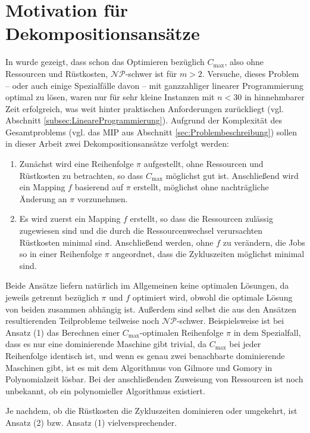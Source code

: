 \documentclass{scrreprt}
\begin{document}
\section{Motivation für Dekompositionsansätze}
In \cite{casestudy} wurde gezeigt, dass schon das Optimieren bezüglich $C_{\max}$, also ohne Ressourcen und Rüstkosten, $\mathcal{NP}$-schwer ist für $m>2$.
Versuche, dieses Problem -- oder auch einige Spezialfälle davon -- mit ganzzahliger linearer Programmierung optimal zu lösen, waren nur für sehr kleine Instanzen mit
$n<30$ in hinnehmbarer Zeit erfolgreich, was weit hinter praktischen Anforderungen zurückliegt (vgl. Abschnitt \ref{subsec:LineareProgrammierung}).
Aufgrund der Komplexität des Gesamtproblems (vgl. das MIP aus Abschnitt \ref{sec:Problembeschreibung}) sollen in dieser Arbeit zwei Dekompositionsansätze verfolgt werden:
\begin{enumerate}
    \item Zunächst wird eine Reihenfolge $\pi$ aufgestellt, ohne Ressourcen und Rüstkosten zu betrachten, so dass $C_{\max}$ möglichst gut ist.
        Anschließend wird ein Mapping $f$ basierend auf $\pi$ erstellt, möglichst ohne nachträgliche Änderung an $\pi$ vorzunehmen.
    \item Es wird zuerst ein Mapping $f$ erstellt, so dass die Ressourcen zulässig zugewiesen sind und die durch die Ressourcenwechsel verursachten Rüstkosten minimal sind.
        Anschließend werden, ohne $f$ zu verändern, die Jobs so in einer Reihenfolge $\pi$ angeordnet, dass die Zykluszeiten möglichst minimal sind.
\end{enumerate}%
Beide Ansätze liefern natürlich im Allgemeinen keine optimalen Lösungen, da jeweils getrennt bezüglich $\pi$ und $f$ optimiert wird,
obwohl die optimale Lösung von beiden zusammen abhängig ist.
Außerdem sind selbst die aus den Ansätzen resultierenden Teilprobleme teilweise noch $\mathcal{NP}$-schwer.
Beispielsweise ist bei Ansatz (1) das Berechnen einer $C_{\max}$-optimalen Reihenfolge $\pi$ in dem Spezialfall,
dass es nur eine dominierende Maschine gibt trivial, da $C_{\max}$ bei jeder Reihenfolge identisch ist,
und wenn es genau zwei benachbarte dominierende Maschinen gibt,
ist es mit dem Algorithmus von Gilmore und Gomory \cite{gg} in Polynomialzeit lösbar.
Bei der anschließenden Zuweisung von Ressourcen ist noch unbekannt, ob ein polynomieller Algorithmus existiert.

Je nachdem, ob die Rüstkosten die Zykluszeiten dominieren oder umgekehrt, ist Ansatz (2) bzw. Ansatz (1) vielversprechender.
\end{document}
